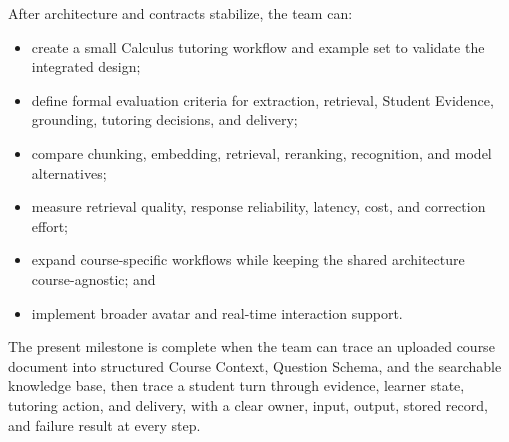 \documentclass[11pt]{article}
\begin{document}
After architecture and contracts stabilize, the team can:

\begin{itemize}
    \item create a small Calculus tutoring workflow and example set to validate the integrated design;
    \item define formal evaluation criteria for extraction, retrieval, Student Evidence, grounding, tutoring decisions, and delivery;
    \item compare chunking, embedding, retrieval, reranking, recognition, and model alternatives;
    \item measure retrieval quality, response reliability, latency, cost, and correction effort;
    \item expand course-specific workflows while keeping the shared architecture course-agnostic; and
    \item implement broader avatar and real-time interaction support.
\end{itemize}

The present milestone is complete when the team can trace an uploaded course document into structured Course Context, Question Schema, and the searchable knowledge base, then trace a student turn through evidence, learner state, tutoring action, and delivery, with a clear owner, input, output, stored record, and failure result at every step.
\end{document}
